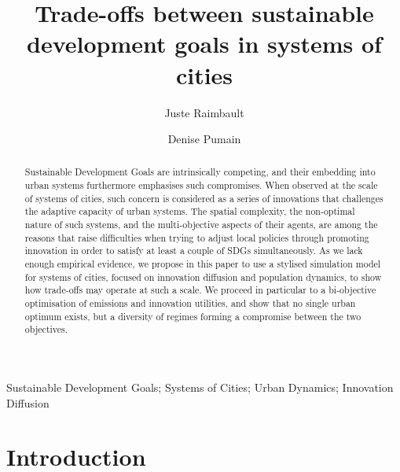 \documentclass[final,5p,times,twocolumn,authoryear]{elsarticle}
\begin{document}
\begin{frontmatter}

\title{Trade-offs between sustainable development goals in systems of cities}

\author[label1,label2,label3]{Juste Raimbault}
\author[label4]{Denise Pumain}

\address[label1]{LASTIG, Univ Gustave Eiffel, IGN-ENSG}
\address[label2]{CASA, University College London}
\address[label3]{UPS CNRS 3611 ISC-PIF}
\address[label4]{UMR CNRS 8504 G{\'e}ographie-cit{\'e}s, Universit{\'e} Paris 1}




\begin{abstract}
    
    Sustainable Development Goals are intrinsically competing, and their embedding into urban systems furthermore emphasises such compromises. When observed at the scale of systems of cities, such concern is considered as a series of innovations that challenges the adaptive capacity of urban systems. The spatial complexity, the non-optimal nature of such systems, and the multi-objective aspects of their agents, are among the reasons that raise difficulties when trying to adjust local policies through promoting innovation in order to satisfy at least a couple of SDGs simultaneously. As we lack enough empirical evidence, we propose in this paper to use a stylised simulation model for systems of cities, focused on innovation diffusion and population dynamics, to show how trade-offs may operate at such a scale. We proceed in particular to a bi-objective optimisation of emissions and innovation utilities, and show that no single urban optimum exists, but a diversity of regimes forming a compromise between the two objectives.
\end{abstract}

\begin{keyword}
Sustainable Development Goals; Systems of Cities; Urban Dynamics; Innovation Diffusion
\end{keyword}

\end{frontmatter}


\linenumbers

\section{Introduction}
\end{document}
